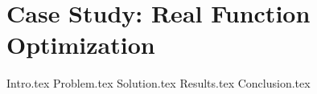 \chapter{Case Study: Real Function Optimization}
\label{chap:fn_opt}
  {Intro.tex}
  {Problem.tex}
  {Solution.tex}
  {Results.tex}
  {Conclusion.tex}
